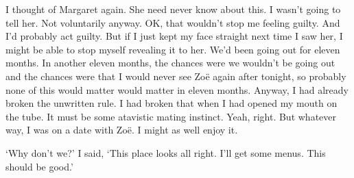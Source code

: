 I thought of Margaret again. She need never know about this. I
wasn't going to tell her. Not voluntarily anyway. OK, that wouldn't
stop me feeling guilty. And I'd probably act guilty. But if I just
kept my face straight next time I saw her, I might be able to stop
myself revealing it to her. We'd been going out for eleven months. In
another eleven months, the chances were we wouldn't be going out and
the chances were that I would never see Zoë again after tonight,
so probably none of this would matter would matter in eleven months.
Anyway, I had already broken the unwritten rule. I had broken that
when I had opened my mouth on the tube. It must be some atavistic
mating instinct. Yeah, right. But whatever way, I was on a {\twelveit date\/} with
Zoë. I might as well enjoy it.

`Why don't we?' I said, `This place looks all right. I'll get some
menus. This should be good.'
\vfill\eject
